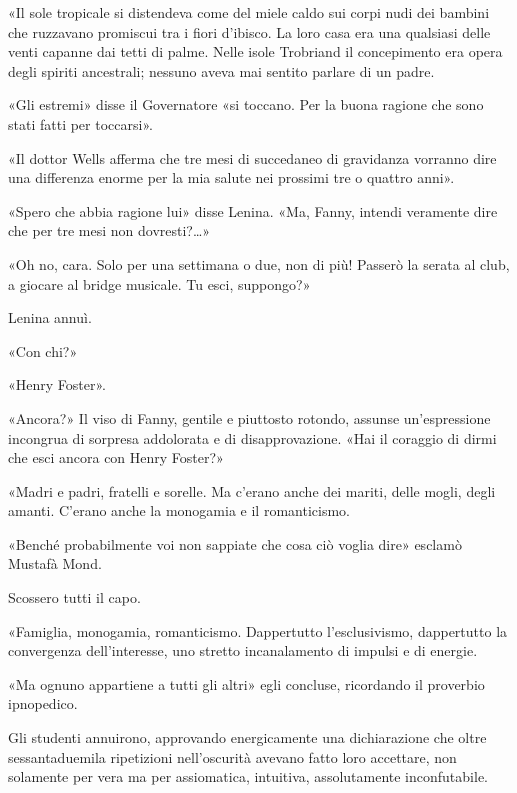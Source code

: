 \documentclass[
a5paper, %
10pt, %
twoside, 
onecolumn, %
openany, %
]{memoir}
\renewenvironment{shaded}{%
  \def\FrameCommand{\fboxsep=\FrameSep \colorbox{shadecolor}}%
  \MakeFramed{\advance\hsize-\width \FrameRestore\FrameRestore}}%
 {\endMakeFramed}
\begin{document}
«Il sole tropicale si distendeva come del miele caldo sui corpi nudi dei bambini che ruzzavano promiscui tra i fiori d’ibisco. La loro casa era una qualsiasi delle venti capanne dai tetti di palme. Nelle isole Trobriand il concepimento era opera degli spiriti ancestrali; nessuno aveva mai sentito parlare di un padre.

«Gli estremi» disse il Governatore «si toccano. Per la buona ragione che sono stati fatti per toccarsi».

\begin{shaded}
    «Il dottor Wells afferma che tre mesi di succedaneo di gravidanza vorranno dire una differenza enorme per la mia salute nei prossimi tre o quattro anni».

«Spero che abbia ragione lui» disse Lenina. «Ma, Fanny, intendi veramente dire che per tre mesi non dovresti?…»

«Oh no, cara. Solo per una settimana o due, non di più! Passerò la serata al club, a giocare al bridge musicale. Tu esci, suppongo?»

Lenina annuì.

«Con chi?»

«Henry Foster».

«Ancora?» Il viso di Fanny, gentile e piuttosto rotondo, assunse un’espressione incongrua di sorpresa addolorata e di disapprovazione. «Hai il coraggio di dirmi che esci ancora con Henry Foster?»
\end{shaded}

«Madri e padri, fratelli e sorelle. Ma c’erano anche dei mariti, delle mogli, degli amanti. C’erano anche la monogamia e il romanticismo.

«Benché probabilmente voi non sappiate che cosa ciò voglia dire» esclamò Mustafà Mond.

Scossero tutti il capo.

«Famiglia, monogamia, romanticismo. Dappertutto l’esclusivismo, dappertutto la convergenza dell’interesse, uno stretto incanalamento di impulsi e di energie.

«Ma ognuno appartiene a tutti gli altri» egli concluse, ricordando il proverbio ipnopedico.

Gli studenti annuirono, approvando energicamente una dichiarazione che oltre sessantaduemila ripetizioni nell’oscurità avevano fatto loro accettare, non solamente per vera ma per assiomatica, intuitiva, assolutamente inconfutabile.
\end{document}
